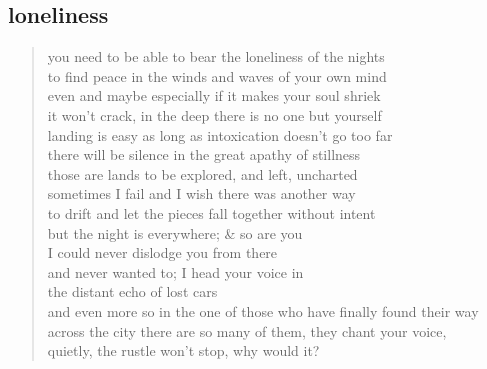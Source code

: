 \documentclass[11pt]{article}
\begin{document}
\subsection{loneliness}
\label{sec:orgf099738}
\begin{verse}
you need to be able to bear the loneliness of the nights\\
to find peace in the winds and waves of your own mind\\
even and maybe especially if it makes your soul shriek\\
it won't crack, in the deep there is no one but yourself\\
\vspace*{1em}
landing is easy as long as intoxication doesn't go too far\\
there will be silence in the great apathy of stillness\\
those are lands to be explored, and left, uncharted\\
sometimes I fail and I wish there was another way\\
to drift and let the pieces fall together without intent\\
\vspace*{1em}
but the night is everywhere; \& so are you\\
I could never dislodge you from there\\
and never wanted to; I head your voice in\\
the distant echo of lost cars\\
and even more so in the one of those who have finally found their way\\
across the city there are so many of them, they chant your voice,\\
quietly, the rustle won't stop, why would it?\\
\end{verse}
\end{document}
